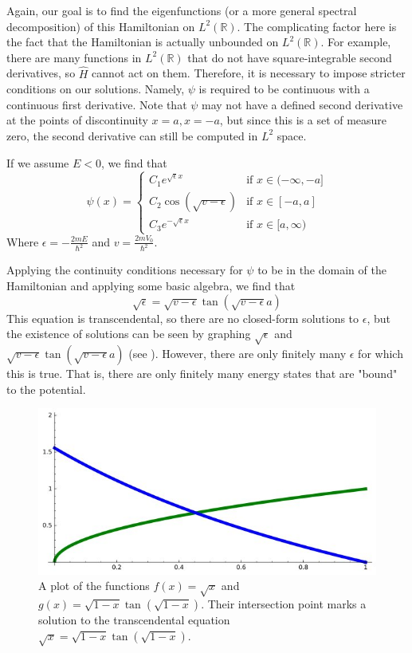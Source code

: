 Again, our goal is to find the eigenfunctions (or a more general spectral
decomposition) of this Hamiltonian on $L^2(\mathbb{R})$.
The complicating factor here is the fact that the Hamiltonian is actually
unbounded on $L^2(\mathbb{R})$. For example, there are many functions in
$L^2(\mathbb{R})$ that do not have square-integrable second derivatives, so
$\hat{H}$ cannot act on them. Therefore, it is
necessary to impose stricter conditions on our solutions. Namely, $\psi$ is
required to be continuous with a continuous first derivative. Note that $\psi$
may not have a defined second derivative at the points of discontinuity $x=a,
x=-a$, but since this is a set of measure zero, the second derivative can still
be computed in $L^2$ space.

If we assume $E<0$, we find that
\[
    \psi(x) =
    \begin{cases}
        C_1e^{\sqrt{\epsilon}x}& \text{if } x\in(-\infty,-a]\\
        C_2\cos(\sqrt{v-\epsilon})& \text{if } x\in[-a,a]\\
        C_3e^{-\sqrt{\epsilon}x}& \text{if } x\in [a, \infty)
    \end{cases}
\]
Where $\epsilon = -\frac{2mE}{\hbar^2}$ and
$v=\frac{2mV_0}{\hbar^2}$.

Applying the continuity conditions necessary for $\psi$ to be in the domain of
the Hamiltonian and applying some basic algebra, we find that
\[
    \sqrt{\epsilon} = \sqrt{v-\epsilon}\tan(\sqrt{v-\epsilon}a)
\]
This equation is transcendental, so there are no closed-form solutions to
$\epsilon$, but the existence of solutions can be seen by graphing
$\sqrt{\epsilon}$ and $\sqrt{v-\epsilon}\tan(\sqrt{v-\epsilon}a)$ (see \cite[p.
78-80]{griffiths2005}).
However, there are only finitely many $\epsilon$ for which this is true. That
is, there are only finitely many energy states that are "bound" to the
potential.

\begin{figure}
    \begin{center}
    \includegraphics[scale=0.5]{transcendental_solutions}
    \caption{A plot of the functions $f(x) = \sqrt{x}$ and
    $g(x)=\sqrt{1-x}\tan(\sqrt{1-x})$. Their intersection point marks a solution
        to the transcendental equation $\sqrt{x} = \sqrt{1-x}\tan(\sqrt{1-x})$.}
    \end{center}
\end{figure}

